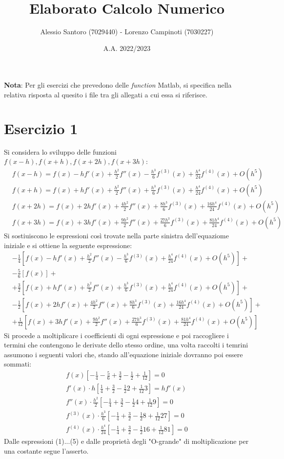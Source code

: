 \documentclass[10pt,a4paper]{article}
\author{Alessio Santoro (7029440) - Lorenzo Campinoti (7030227)}
\title{Elaborato Calcolo Numerico}
\date{A.A. 2022/2023}
\begin{document}
\maketitle 	
\textbf{Nota}: Per gli esercizi che prevedono delle \textit{function} Matlab, si specifica nella relativa risposta al quesito i file tra gli allegati a cui essa si riferisce.
\section*{Esercizio 1}
Si considera lo sviluppo delle funzioni $f(x-h), f(x+h), f(x+2h), f(x+3h)$:
\begin{align*}
&f(x-h)=f(x)-hf'(x)+\frac{h^2}{2}f''(x)-\frac{h^3}{6}f^{(3)}(x)+\frac{h^4}{24}f^{(4)}(x)+O(h^5)\\&f(x+h)=f(x)+hf'(x)+\frac{h^2}{2}f''(x)+\frac{h^3}{6}f^{(3)}(x)+\frac{h^4}{24}f^{(4)}(x)+O(h^5)\\&f(x+2h)=f(x)+2hf'(x)+\frac{4h^2}{2}f''(x)+\frac{8h^3}{6}f^{(3)}(x)+\frac{16h^4}{24}f^{(4)}(x)+O(h^5)\\&f(x+3h)=f(x)+3hf'(x)+\frac{9h^2}{2}f''(x)+\frac{27h^3}{6}f^{(3)}(x)+\frac{81h^4}{24}f^{(4)}(x)+O(h^5)
\end{align*}
Si sostiuiscono le espressioni così trovate nella parte sinistra dell'equaziome iniziale e si ottiene la seguente espressione:
\begin{align*}
&-\frac{1}{4}\left[f(x)-hf'(x)+\frac{h^2}{2}f''(x)-\frac{h^3}{6}f^{(3)}(x)+\frac{h^4}{24}f^{(4)}(x)+O(h^5)\right]+\\&-\frac{5}{6}\left[f(x)\right]+\\&+\frac{3}{2}\left[f(x)+hf'(x)+\frac{h^2}{2}f''(x)+\frac{h^3}{6}f^{(3)}(x)+\frac{h^4}{24}f^{(4)}(x)+O(h^5)\right]+\\&-\frac{1}{2}\left[f(x)+2hf'(x)+\frac{4h^2}{2}f''(x)+\frac{8h^3}{6}f^{(3)}(x)+\frac{16h^4}{24}f^{(4)}(x)+O(h^5)\right]+\\&+\frac{1}{12}\left[f(x)+3hf'(x)+\frac{9h^2}{2}f''(x)+\frac{27h^3}{6}f^{(3)}(x)+\frac{81h^4}{24}f^{(4)}(x)+O(h^5)\right]
\end{align*}
Si procede a moltiplicare i coefficienti di ogni espressione e poi raccogliere i termini che contengono le derivate dello stesso ordine, una volta raccolti i temrini assumono i seguenti valori che, stando all'equazione iniziale dovranno poi essere sommati:
\begin{align}
f(x)\left[-\frac{1}{4}-\frac{5}{6}+\frac{3}{2}-\frac{1}{2}+\frac{1}{12}\right]=0\\	f'(x)\cdot h\left[\frac{1}{4}+\frac{3}{2}-\frac{1}{2}2+\frac{1}{12}3\right]=hf'(x)\\f''(x)\cdot\frac{h^2}{2}\left[-\frac{1}{4}+\frac{3}{2}-\frac{1}{2}4+\frac{1}{12}9\right]=0\\f^{(3)}(x)\cdot\frac{h^3}{6}\left[-\frac{1}{4}+\frac{3}{2}-\frac{1}{2}8+\frac{1}{12}27\right]=0\\f^{(4)}(x)\cdot\frac{h^4}{24}\left[-\frac{1}{4}+\frac{3}{2}-\frac{1}{2}16+\frac{1}{12}81\right]=0
\end{align}
Dalle espressioni (1)...(5) e dalle proprietà degli "O-grande" di moltiplicazione per una costante segue l'asserto.
\end{document}
